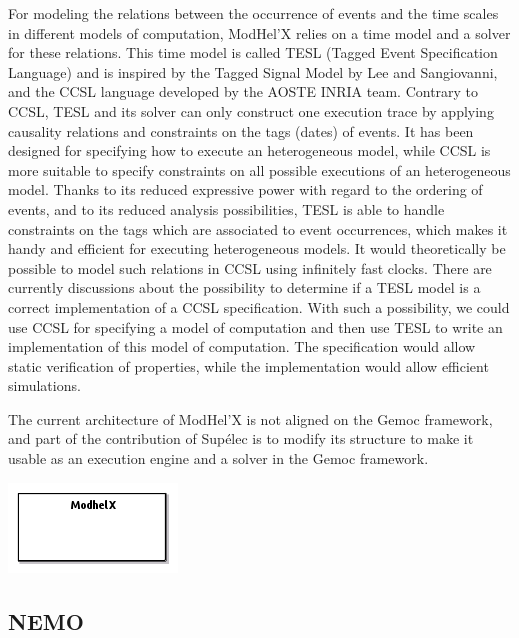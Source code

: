 \documentclass{gemoc} %
\begin{document}
For modeling the relations between the occurrence of events and the time scales in different models of computation, ModHel'X relies on a time model and a solver for these relations. This time model is called TESL (Tagged Event Specification Language) and is inspired by the Tagged Signal Model by Lee and Sangiovanni, and the CCSL language developed by the AOSTE INRIA team. Contrary to CCSL, TESL and its solver can only construct one execution trace by applying causality relations and constraints on the tags (dates) of events. It has been designed for specifying how to execute an heterogeneous model, while CCSL is more suitable to specify constraints on all possible executions of an heterogeneous model. Thanks to its reduced expressive power with regard to the ordering of events, and to its reduced analysis possibilities, TESL is able to handle constraints on the tags which are associated to event occurrences, which makes it handy and efficient for executing heterogeneous models. It would theoretically be possible to model such relations in CCSL using infinitely fast clocks. There are currently discussions about the possibility to determine if a TESL model is a correct implementation of a CCSL specification. With such a possibility, we could use CCSL for specifying a model of computation and then use TESL to write an implementation of this model of computation. The specification would allow static verification of properties, while the implementation would allow efficient simulations.

The current architecture of ModHel'X is not aligned on the Gemoc framework, and part of the contribution of Sup\'elec is to modify its structure to make it usable as an execution engine and a solver in the Gemoc framework.


\begin{center}
\includegraphics*[trim=0.0cm 0.0cm 0cm 0.0cm, clip=true]{../images/generated/Generated_Modhel_X.png}
\end{center}




\subsection{NEMO}
\end{document}
